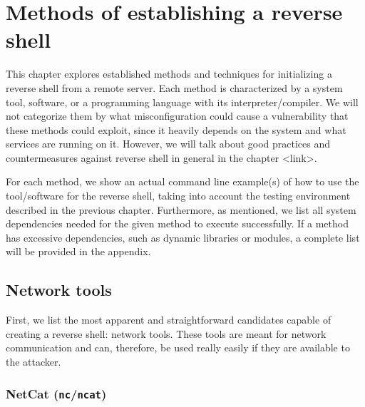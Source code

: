 \newcommand{\commandpath}[1]{chapters/chapter3/commands/#1}
\newcommand{\dpd}[1]{\vspace{-\baselineskip} \vspace{5pt} \begin{adjustwidth}{10pt}{0pt}\small \textbf{Dependencies:} #1 \end{adjustwidth}}
\newcommand{\notte}[1]{\vspace{-\baselineskip} \vspace{5pt} \begin{adjustwidth}{10pt}{0pt} \small \textbf{Note:} #1 \end{adjustwidth}}
\newcommand{\version}[1]{\textbf{Version:} #1}

\chapter{Methods of establishing a reverse shell}
\label{chap:methods}

This chapter explores established methods and techniques for initializing a reverse shell from a remote server. Each method is characterized by a system tool, software, or a programming language with its interpreter/compiler. We will not categorize them by what misconfiguration could cause a vulnerability that these methods could exploit, since it heavily depends on the system and what services are running on it. However, we will talk about good practices and countermeasures against reverse shell in general in the chapter <link>.

For each method, we show an actual command line example(s) of how to use the tool/software for the reverse shell, taking into account the testing environment described in the previous chapter. Furthermore, as mentioned, we list all system dependencies needed for the given method to execute successfully. If a method has excessive dependencies, such as dynamic libraries or modules, a complete list will be provided in the appendix.


\section{Network tools}

First, we list the most apparent and straightforward candidates capable of creating a reverse shell: network tools. These tools are meant for network communication and can, therefore, be used really easily if they are available to the attacker.


\subsection{NetCat (\texttt{nc}/\texttt{ncat})}

